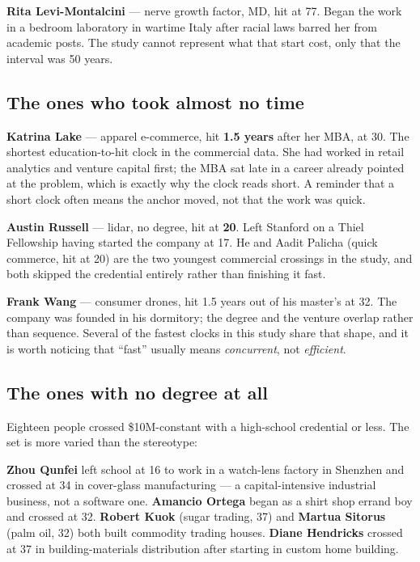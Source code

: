 \documentclass[11pt]{article}
\begin{document}
\textbf{Rita Levi-Montalcini} --- nerve growth factor, MD, hit at 77. Began the
work in a bedroom laboratory in wartime Italy after racial laws barred her from
academic posts. The study cannot represent what that start cost, only that the
interval was 50 years.

\subsection*{The ones who took almost no time}

\textbf{Katrina Lake} --- apparel e-commerce, hit \textbf{1.5 years} after her
MBA, at 30. The shortest education-to-hit clock in the commercial data. She had
worked in retail analytics and venture capital first; the MBA sat late in a
career already pointed at the problem, which is exactly why the clock reads short.
A reminder that a short clock often means the anchor moved, not that the work
was quick.

\textbf{Austin Russell} --- lidar, no degree, hit at \textbf{20}. Left Stanford
on a Thiel Fellowship having started the company at 17. He and Aadit Palicha
(quick commerce, hit at 20) are the two youngest commercial crossings in the
study, and both skipped the credential entirely rather than finishing it fast.

\textbf{Frank Wang} --- consumer drones, hit 1.5 years out of his master's at 32.
The company was founded in his dormitory; the degree and the venture overlap
rather than sequence. Several of the fastest clocks in this study share that
shape, and it is worth noticing that ``fast'' usually means \emph{concurrent},
not \emph{efficient}.

\subsection*{The ones with no degree at all}

Eighteen people crossed \$10M-constant with a high-school credential or less.
The set is more varied than the stereotype:

\textbf{Zhou Qunfei} left school at 16 to work in a watch-lens factory in
Shenzhen and crossed at 34 in cover-glass manufacturing --- a capital-intensive
industrial business, not a software one. \textbf{Amancio Ortega} began as a shirt
shop errand boy and crossed at 32. \textbf{Robert Kuok} (sugar trading, 37) and
\textbf{Martua Sitorus} (palm oil, 32) both built commodity trading houses.
\textbf{Diane Hendricks} crossed at 37 in building-materials distribution after
starting in custom home building.
\end{document}
